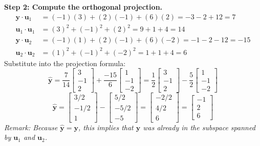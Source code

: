 \documentclass[11pt, letterpaper]{article}
\theoremstyle{definition}
\theoremstyle{remark}
\begin{document}
\textbf{Step 2: Compute the orthogonal projection.}
\begin{align*}
    \mathbf{y} \cdot \mathbf{u}_1 &= (-1)(3) + (2)(-1) + (6)(2) = -3 - 2 + 12 = 7 \\
    \mathbf{u}_1 \cdot \mathbf{u}_1 &= (3)^2 + (-1)^2 + (2)^2 = 9 + 1 + 4 = 14 \\
    \mathbf{y} \cdot \mathbf{u}_2 &= (-1)(1) + (2)(-1) + (6)(-2) = -1 - 2 - 12 = -15 \\
    \mathbf{u}_2 \cdot \mathbf{u}_2 &= (1)^2 + (-1)^2 + (-2)^2 = 1 + 1 + 4 = 6
\end{align*}
Substitute into the projection formula:
\[ \hat{\mathbf{y}} = \frac{7}{14} \begin{bmatrix} 3 \\ -1 \\ 2 \end{bmatrix} + \frac{-15}{6} \begin{bmatrix} 1 \\ -1 \\ -2 \end{bmatrix} = \frac{1}{2} \begin{bmatrix} 3 \\ -1 \\ 2 \end{bmatrix} - \frac{5}{2} \begin{bmatrix} 1 \\ -1 \\ -2 \end{bmatrix} \]
\[ \hat{\mathbf{y}} = \begin{bmatrix} 3/2 \\ -1/2 \\ 1 \end{bmatrix} - \begin{bmatrix} 5/2 \\ -5/2 \\ -5 \end{bmatrix} = \begin{bmatrix} -2/2 \\ 4/2 \\ 6 \end{bmatrix} = \begin{bmatrix} -1 \\ 2 \\ 6 \end{bmatrix} \]
\textit{Remark: Because $\hat{\mathbf{y}} = \mathbf{y}$, this implies that $\mathbf{y}$ was already in the subspace spanned by $\mathbf{u}_1$ and $\mathbf{u}_2$.}
\end{document}
